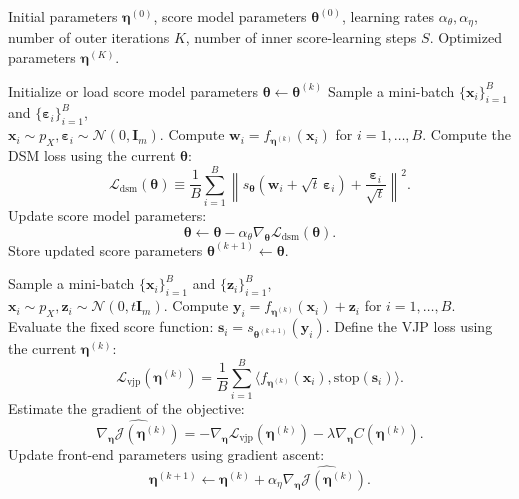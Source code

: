 \documentclass[conference]{IEEEtran}
\begin{document}
\begin{algorithm}
\caption{Alternating Optimization for MI Maximization}
\label{alg:alternating_opt}
\begin{algorithmic}[1]
\Require Initial parameters $\bm \eta^{(0)}$, score model parameters $\bm \theta^{(0)}$, learning rates $\alpha_\theta, \alpha_\eta$, number of outer iterations $K$, number of inner score-learning steps $S$.
\Ensure Optimized parameters $\bm \eta^{(K)}$.


\State Initialize or load score model parameters $\bm \theta \leftarrow \bm \theta^{(k)}$
        \State Sample a mini-batch $\{\bm x_i\}_{i=1}^B$ and $\{\bm \varepsilon_i\}_{i=1}^B$,\\
        \hspace{1cm}$\bm x_i \sim p_X, \bm \varepsilon_i \sim \mathcal{N}(0, \bm I_m)$.
        \State Compute $\bm w_i = f_{\bm \eta^{(k)}}(\bm x_i)$ for $i=1,\dots,B$.
        \State Compute the DSM loss using the current $\bm \theta$:
            \[ \mathcal{L}_{\text{dsm}}(\bm \theta) \equiv \frac{1}{B} \sum_{i=1}^B \left\|s_{\bm \theta}(\bm w_i + \sqrt{t}\,\bm \varepsilon_i) + \frac{\bm \varepsilon_i}{\sqrt{t}}\right\|^2. \]
        \State Update score model parameters:
            \[ \bm \theta \leftarrow \bm \theta - \alpha_\theta \nabla_{\bm \theta} \mathcal{L}_{\text{dsm}}(\bm \theta). \]
    \EndFor
    \State Store updated score parameters $\bm \theta^{(k+1)} \leftarrow \bm \theta$.

    \State Sample a mini-batch $\{\bm x_i\}_{i=1}^B$ and $\{\bm z_i\}_{i=1}^B$,\\
    \hspace{0.5cm}$\bm x_i \sim p_X, \bm z_i \sim \mathcal{N}(0, t \bm I_m)$.
    \State Compute $\bm y_i = f_{\bm \eta^{(k)}}(\bm x_i) + \bm z_i$ for $i=1,\dots,B$.
    \State Evaluate the fixed score function: $\bm s_i = s_{\bm \theta^{(k+1)}}(\bm y_i)$.
    \State Define the VJP loss using the current $\bm \eta^{(k)}$:
        \[ \mathcal{L}_{\text{vjp}}(\bm \eta^{(k)}) = \frac{1}{B}\sum_{i=1}^B \langle f_{\bm \eta^{(k)}}(\bm{x}_i), \text{stop}(\bm s_i) \rangle. \]
    \State Estimate the gradient of the objective: 
        \[ \widehat{\nabla_{\bm\eta} \mathcal{J}(\bm \eta^{(k)})} = - \nabla_{\bm \eta} \mathcal{L}_{\text{vjp}}(\bm \eta^{(k)}) - \lambda \nabla_{\bm \eta} C(\bm \eta^{(k)}). \]
    \State Update front-end parameters using gradient ascent:
        \[ \bm \eta^{(k+1)} \leftarrow \bm \eta^{(k)} + \alpha_\eta \widehat{\nabla_{\bm\eta} \mathcal{J}(\bm \eta^{(k)}).} \]
\EndFor
\end{algorithmic}
\end{algorithm}
\end{document}
